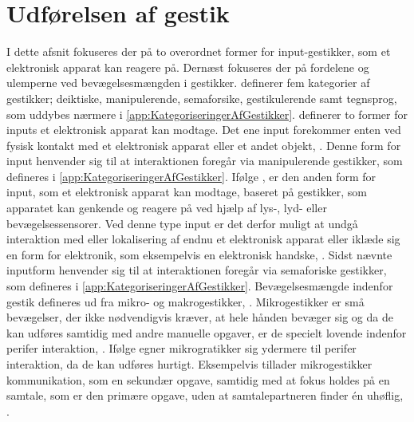 \section{Udførelsen af gestik}
\label{UdfoerelseAfGestik}
%
I dette afsnit fokuseres der på to overordnet former for input-gestikker, som et elektronisk apparat kan reagere på. Dernæst fokuseres der på fordelene og ulemperne ved bevægelsesmængden i gestikker. \textcite[s. 9]{PDF:ATaxonomyOfGestures} definerer fem kategorier af gestikker; deiktiske, manipulerende, semaforsike, gestikulerende samt tegnsprog, som uddybes nærmere i \autoref{app:KategoriseringerAfGestikker}. \blankline
%
\textcite[s. 9]{PDF:ATaxonomyOfGestures} definerer to former for inputs et elektronisk apparat kan modtage. Det ene input forekommer enten ved fysisk kontakt med et elektronisk apparat eller et andet objekt, \parencite[s. 10]{PDF:ATaxonomyOfGestures}. Denne form for input henvender sig til at interaktionen foregår via manipulerende gestikker, som defineres i \autoref{app:KategoriseringerAfGestikker}. Ifølge \textcite[s. 12]{PDF:ATaxonomyOfGestures}, er den anden form for input, som et elektronisk apparat kan modtage, baseret på gestikker, som apparatet kan genkende og reagere på ved hjælp af lys-, lyd- eller bevægelsessensorer. Ved denne type input er det derfor muligt at undgå interaktion med eller lokalisering af endnu et elektronisk apparat eller iklæde sig en form for elektronik, som eksempelvis en elektronisk handske, \parencite[s. 12]{PDF:ATaxonomyOfGestures}. Sidst nævnte inputform henvender sig til at interaktionen foregår via semaforiske gestikker, som defineres i \autoref{app:KategoriseringerAfGestikker}. \blankline
%
Bevægelsesmængde indenfor gestik defineres ud fra mikro- og makrogestikker, \parencite[s. 6]{PDF:UsabilityofMicroVsMacroGestures}. Mikrogestikker er små bevægelser, der ikke nødvendigvis kræver, at hele hånden bevæger sig og da de kan udføres samtidig med andre manuelle opgaver, er de specielt lovende indenfor perifer interaktion, \parencite[s. 95]{PDF:PIMicrogesturesKap5}. Ifølge \textcite[s. 96]{PDF:PIMicrogesturesKap5} egner mikrogratikker sig ydermere til perifer interaktion, da de kan udføres hurtigt. Eksempelvis tillader mikrogestikker kommunikation, som en sekundær opgave, samtidig med at fokus holdes på en samtale, som er den primære opgave, uden at samtalepartneren finder én uhøflig, \parencite[s. 97]{PDF:PIMicrogesturesKap5}.

